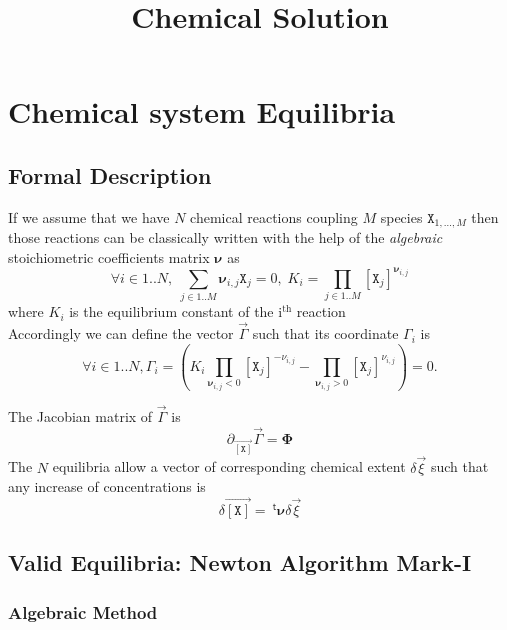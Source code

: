 \documentclass[aps,twocolumn]{revtex4}
\newcommand{\myconc}[1]{\left\lbrack #1 \right\rbrack}
\newcommand{\mychem}[1]{{\mathtt{#1}}}
\newcommand{\species}{\mychem{X}}
\newcommand{\mymat}[1]{\boldsymbol{#1}}
\newcommand{\mytrn}[1]{{\!\!~^{\mathsf{t}}{#1}}}
\newcommand{\myvec}[1]{\overrightarrow{#1}}
\newcommand{\vecX}{\myvec{\myconc{\mychem{X}}}}
\begin{document}
\title{Chemical Solution}


\maketitle

\section{Chemical system Equilibria}
\subsection{Formal Description}
If we assume that we have $N$ chemical reactions coupling $M$ species $\species_{1,\ldots,M}$ then those reactions can be classically written with the help
of the \textit{algebraic} stoichiometric coefficients matrix $\mymat{\nu}$ as
\begin{equation}
	\label{eq:Ki}
	\forall i \in 1..N, \; \sum_{j\in1..M} \mymat{\nu}_{i,j} \species_j = 0, \; K_i=\prod_{j\in1..M} \myconc{\species_j}^{\mymat{\nu}_{i,j}}
\end{equation}
where $K_i$ is the equilibrium constant of the i$^{\text{th}}$ reaction\\
Accordingly we can define the vector $\vec{\Gamma}$ such that its coordinate ${\Gamma}_i$ is
\begin{equation}
	\label{eq:Gamma}
	\forall i \in 1..N, {\Gamma}_i =  \left( K_i \prod_{\mymat{\nu}_{i,j}<0} \myconc{\species_j}^{-\nu_{i,j}} - \prod_{\mymat{\nu}_{i,j}>0} \myconc{\species_j}^{\nu_{i,j}}\right) = 0.
\end{equation}

The Jacobian matrix of $\vec{\Gamma}$ is
\begin{equation}
	\partial_{\vecX} \vec{\Gamma} = \mymat{\Phi}
\end{equation}
The $N$ equilibria allow a vector of corresponding chemical extent $\delta\vec{\xi}$ such that any increase of concentrations is
\begin{equation}
	\delta\vecX = \mytrn{\mymat{\nu}} \delta\vec{\xi}
\end{equation}

\subsection{Valid Equilibria: Newton Algorithm Mark-I}
\subsubsection{Algebraic Method}
\end{document}
